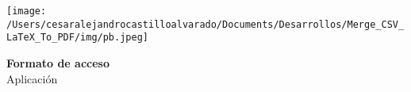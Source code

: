 \documentclass{letter}
\begin{document}

\begin{center}
    
\texttt{[image: /Users/cesaralejandrocastilloalvarado/Documents/Desarrollos/Merge\_CSV\_LaTeX\_To\_PDF/img/pb.jpeg]}

\vspace{3\baselineskip}
\textbf{{\LARGE Formato de acceso}} \\
\vspace{.5\baselineskip}
{\LARGE Aplicación}


\end{center}
\end{document}
